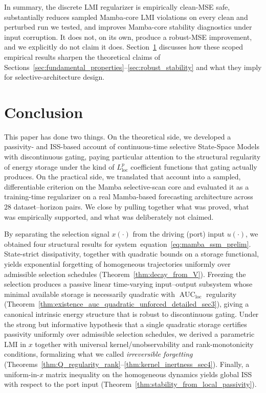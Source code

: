 \documentclass[10pt]{article} %
\def\eqref#1{equation~\ref{#1}}
\newcommand{\loc}{\mathrm{loc}}                         %
\DeclareMathOperator{\AUC}{AUC}                         %
\theoremstyle{definition}
\begin{document}
In summary, the discrete LMI regularizer is empirically clean-MSE safe, substantially reduces sampled Mamba-core LMI violations on every clean and perturbed run we tested, and improves Mamba-core stability diagnostics under input corruption. It does not, on its own, produce a robust-MSE improvement, and we explicitly do not claim it does. Section~\ref{sec:conclusion} discusses how these scoped empirical results sharpen the theoretical claims of Sections~\ref{sec:fundamental_properties}--\ref{sec:robust_stability} and what they imply for selective-architecture design.

\section{Conclusion}
\label{sec:conclusion}

This paper has done two things. On the theoretical side, we developed a passivity- and ISS-based account of continuous-time selective State-Space Models with discontinuous gating, paying particular attention to the structural regularity of energy storage under the kind of $L^p_{\loc}$ coefficient functions that gating actually produces. On the practical side, we translated that account into a sampled, differentiable criterion on the Mamba selective-scan core and evaluated it as a training-time regularizer on a real Mamba-based forecasting architecture across $28$ dataset--horizon pairs. We close by pulling together what was proved, what was empirically supported, and what was deliberately not claimed.

By separating the selection signal $x(\cdot)$ from the driving (port) input $u(\cdot)$, we obtained four structural results for system~\eqref{eq:mamba_ssm_prelim}. State-strict dissipativity, together with quadratic bounds on a storage functional, yields exponential forgetting of homogeneous trajectories uniformly over admissible selection schedules (Theorem~\ref{thm:decay_from_V}). Freezing the selection produces a passive linear time-varying input--output subsystem whose minimal available storage is necessarily quadratic with $\AUC_{\loc}$ regularity (Theorem~\ref{thm:existence_auc_quadratic_unforced_detailed_sec3}), giving a canonical intrinsic energy structure that is robust to discontinuous gating. Under the strong but informative hypothesis that a single quadratic storage certifies passivity uniformly over admissible selection schedules, we derived a parametric LMI in $x$ together with universal kernel/unobservability and rank-monotonicity conditions, formalizing what we called \emph{irreversible forgetting} (Theorems~\ref{thm:Q_regularity_rank}--\ref{thm:kernel_inertness_sec4}). Finally, a uniform-in-$x$ matrix inequality on the homogeneous dynamics yields global ISS with respect to the port input (Theorem~\ref{thm:stability_from_local_passivity}).
\end{document}

